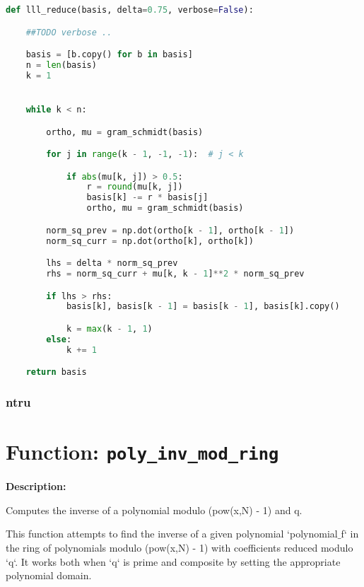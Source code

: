 \documentclass[a4paper,12pt]{article}
\begin{document}
\begin{lstlisting}[language=Python]
def lll_reduce(basis, delta=0.75, verbose=False):

    ##TODO verbose ..

    basis = [b.copy() for b in basis]
    n = len(basis)
    k = 1


    while k < n:

        ortho, mu = gram_schmidt(basis)

        for j in range(k - 1, -1, -1):  # j < k

            if abs(mu[k, j]) > 0.5:
                r = round(mu[k, j])
                basis[k] -= r * basis[j]
                ortho, mu = gram_schmidt(basis)

        norm_sq_prev = np.dot(ortho[k - 1], ortho[k - 1])
        norm_sq_curr = np.dot(ortho[k], ortho[k])

        lhs = delta * norm_sq_prev
        rhs = norm_sq_curr + mu[k, k - 1]**2 * norm_sq_prev

        if lhs > rhs:
            basis[k], basis[k - 1] = basis[k - 1], basis[k].copy()

            k = max(k - 1, 1)
        else:
            k += 1

    return basis
\end{lstlisting}












\subsubsection{ntru}

\section*{Function: \texttt{poly\_inv\_mod\_ring}}

\textbf{Description:}

Computes the inverse of a polynomial modulo (pow(x,N) - 1) and q.

This function attempts to find the inverse of a given polynomial `polynomial$\_$f` in the ring
of polynomials modulo (pow(x,N) - 1) with coefficients reduced modulo `q`. It works both when `q`
is prime and composite by setting the appropriate polynomial domain.
\end{document}
